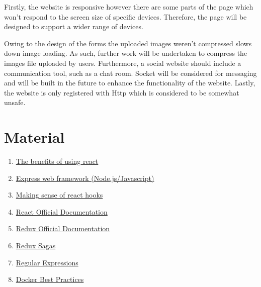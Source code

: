 \documentclass[a4paper]{article}
\begin{document}
Firstly, the website is responsive however there are some parts of the page which won't respond to the screen size of specific devices. Therefore, the page will be designed to support a wider range of devices.

Owing to the design of the forms the uploaded images weren't compressed slows down image loading. As such, further work will be undertaken to compress the images file uploaded by users. 
Furthermore, a social website should include a communication tool, such as a chat room. Socket will be considered for messaging and will be built in the future to enhance the functionality of the website. 
Lastly, the website is only registered with Http which is considered to be somewhat unsafe.

\section{Material}
\begin{enumerate}
    \item \href{https://www.sourcetoad.com/app-development/the-benefits-of-using-react}{The benefits of using react}
    \item \href{https://developer.mozilla.org/en-US/docs/Learn/Server-side/Express_Nodejs}{Express web framework (Node.js/Javascript)}
    \item \href{https://medium.com/@dan_abramov/making-sense-of-react-hooks-fdbde8803889}{Making sense of react hooks}
    \item \href{https://reactjs.org/}{React Official Documentation}
    \item \href{https://redux.js.org/}{Redux Official Documentation}
    \item \href{https://medium.com/@aksudupa11/redux-sagas-714370b61692}{Redux Sagas}
    \item \href{https://developer.mozilla.org/en-US/docs/Web/JavaScript/Guide/Regular_Expressions}{Regular Expressions}
    \item \href{https://www.marcelbelmont.com/docker-workshop/docs/docker-best-practices}{Docker Best Practices}
\end{enumerate}
\end{document}

